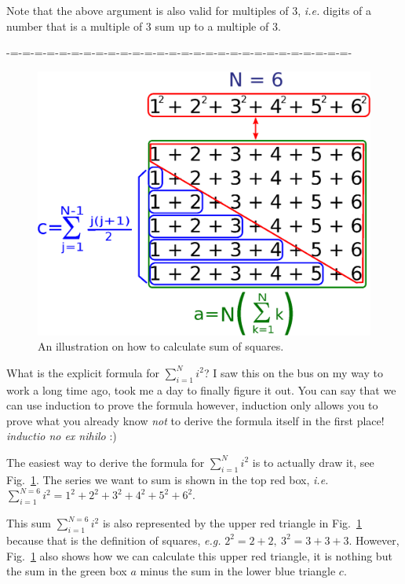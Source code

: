 \documentclass[aps,preprint,preprintnumbers,nofootinbib,showpacs,prd]{revtex4-1}
\newcommand{\ie}{{\it i.e.} }
\newcommand{\eg}{{\it e.g.} }
\begin{document}
Note that the above argument is also valid for multiples of 3, \ie digits of a number that is a multiple of 3 sum up to a multiple of 3.

-=-=-=-=-=-=-=-=-=-=-=-=-=-=-=-=-=-=-=-=-=-=-=-=-=-=-=-=-

%
\begin{figure}
\begin{center}
  \includegraphics[scale=0.45]{n-squared-plots/n_squared_sum_box_1.eps}
\end{center}
  \caption{\label{fig:sum-sq-1}
An illustration on how to calculate sum of squares.}
\end{figure}
%
What is the explicit formula for $\sum_{i=1}^{N} i^2$? I saw this on the bus on my way to work a long time ago, took me a day to finally figure it out. You can say that we can use induction to prove the formula however, induction only allows you to prove what you already know {\it not} to derive the formula itself in the first place! {\it inductio no ex nihilo} :)

The easiest way to derive the formula for $\sum_{i=1}^{N} i^2$ is to actually draw it, see Fig.~\ref{fig:sum-sq-1}. The series we want to sum is shown in the top red box, \ie $\sum_{i=1}^{N=6} i^2 = 1^2 + 2^2 + 3^2 + 4^2 + 5^2 + 6^2$.

This sum $\sum_{i=1}^{N=6} i^2$ is also represented by the upper red triangle in Fig.~\ref{fig:sum-sq-1} because that is the definition of squares, \eg $2^2 = 2 + 2,~3^2 = 3 + 3 + 3$. However, Fig.~\ref{fig:sum-sq-1} also shows how we can calculate this upper red triangle, it is nothing but the sum in the green box $a$ minus the sum in the lower blue triangle $c$.
\end{document}
